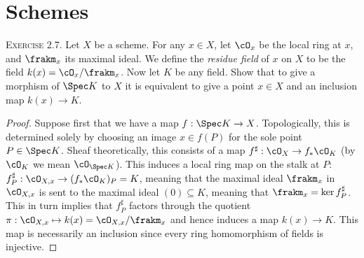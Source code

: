 \section{Schemes}
\begin{problemset}	
	\item[\textsc{Exercise 2.7.}] Let $X$ be a scheme. For any $x \in X$, let $\cO_x$ be the local ring at $x$, and $\frakm_x$ its maximal ideal. We define the \emph{residue field} of $x$ on $X$ to be the field $k(x) = \cO_x/\frakm_x$. Now let $K$ be any field. Show that to give a morphism of $\Spec K$ to $X$ it is equivalent to give a point $x \in X$ and an inclusion map $k(x) \to K$.
	\begin{proof}
		Suppose first that we have a map $f:\Spec K \to X$. Topologically, this is determined solely by choosing an image $x\in f(P)$ for the sole point $P\in \Spec K$. Sheaf theoretically, this consists of a map $f^\sharp:\cO_X \to f_*\cO_K$ (by $\cO_K$ we mean $\cO_{\Spec K}$). This induces a local ring map on the stalk at $P$: $f^\sharp_P:\cO_{X,x}\to (f_*\cO_{K})_P = K$, meaning that the maximal ideal $\frakm_x$ in $\cO_{X,x}$ is sent to the maximal ideal $(0) \subseteq K$, meaning that $\frakm_x = \ker f^\sharp_P$. This in turn implies that $f^{\sharp}_P$ factors through the quotient $\pi:\cO_{X,x} \mapsto k(x) = \cO_{X,x}/\frakm_x$ and hence induces a map $k(x) \to K$. This map is necessarily an inclusion since every ring homomorphism of fields is injective.


\end{proof}
\end{problemset}
